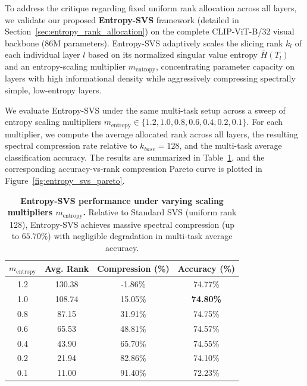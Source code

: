 To address the critique regarding fixed uniform rank allocation across all layers, we validate our proposed \textbf{Entropy-SVS} framework (detailed in Section~\ref{sec:entropy_rank_allocation}) on the complete CLIP-ViT-B/32 visual backbone (86M parameters). Entropy-SVS adaptively scales the slicing rank $k_l$ of each individual layer $l$ based on its normalized singular value entropy $\bar{H}(T_l)$ and an entropy-scaling multiplier $m_{\text{entropy}}$, concentrating parameter capacity on layers with high informational density while aggressively compressing spectrally simple, low-entropy layers.

We evaluate Entropy-SVS under the same multi-task setup across a sweep of entropy scaling multipliers $m_{\text{entropy}} \in \{1.2, 1.0, 0.8, 0.6, 0.4, 0.2, 0.1\}$. For each multiplier, we compute the average allocated rank across all layers, the resulting spectral compression rate relative to $k_{base}=128$, and the multi-task average classification accuracy. The results are summarized in Table~\ref{tab:entropy_sweep_results}, and the corresponding accuracy-vs-rank compression Pareto curve is plotted in Figure~\ref{fig:entropy_svs_pareto}.

\begin{table}[ht]
\caption{\textbf{Entropy-SVS performance under varying scaling multipliers $m_{\text{entropy}}$.} Relative to Standard SVS (uniform rank 128), Entropy-SVS achieves massive spectral compression (up to $65.70\%$) with negligible degradation in multi-task average accuracy.}
\label{tab:entropy_sweep_results}
\vskip 0.15in
\begin{center}
\begin{small}
\begin{sc}
\begin{tabular}{cccc}
\toprule
$m_{\text{entropy}}$ & Avg. Rank & Compression (\%) & Accuracy (\%) \\
\midrule
1.2 & 130.38 & -1.86\% & 74.77\% \\
1.0 & 108.74 & 15.05\% & \textbf{74.80\%} \\
0.8 & 87.15 & 31.91\% & 74.75\% \\
0.6 & 65.53 & 48.81\% & 74.57\% \\
0.4 & 43.90 & 65.70\% & 74.55\% \\
0.2 & 21.94 & 82.86\% & 74.10\% \\
0.1 & 11.00 & 91.40\% & 72.23\% \\
\bottomrule
\end{tabular}
\end{sc}
\end{small}
\end{center}
\vskip -0.1in
\end{table}

